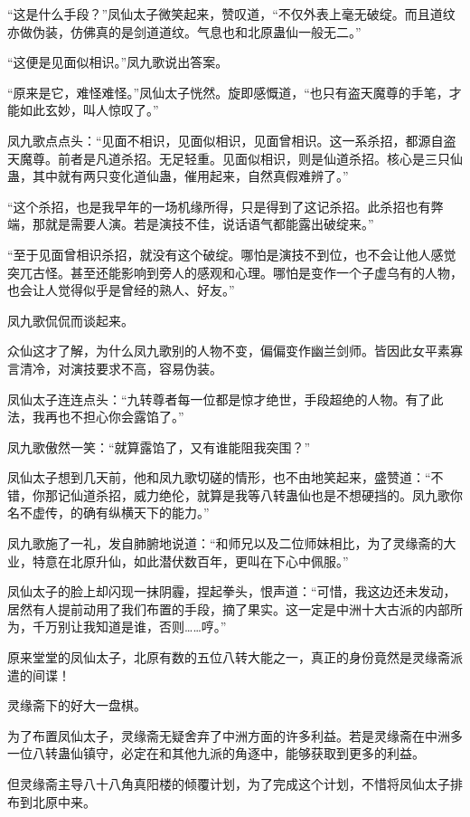 \begin{this_body}
“这是什么手段？”凤仙太子微笑起来，赞叹道，“不仅外表上毫无破绽。而且道纹亦做伪装，仿佛真的是剑道道纹。气息也和北原蛊仙一般无二。”

“这便是见面似相识。”凤九歌说出答案。

“原来是它，难怪难怪。”凤仙太子恍然。旋即感慨道，“也只有盗天魔尊的手笔，才能如此玄妙，叫人惊叹了。”

凤九歌点点头：“见面不相识，见面似相识，见面曾相识。这一系杀招，都源自盗天魔尊。前者是凡道杀招。无足轻重。见面似相识，则是仙道杀招。核心是三只仙蛊，其中就有两只变化道仙蛊，催用起来，自然真假难辨了。”

“这个杀招，也是我早年的一场机缘所得，只是得到了这记杀招。此杀招也有弊端，那就是需要人演。若是演技不佳，说话语气都能露出破绽来。”

“至于见面曾相识杀招，就没有这个破绽。哪怕是演技不到位，也不会让他人感觉突兀古怪。甚至还能影响到旁人的感观和心理。哪怕是变作一个子虚乌有的人物，也会让人觉得似乎是曾经的熟人、好友。”

凤九歌侃侃而谈起来。

众仙这才了解，为什么凤九歌别的人物不变，偏偏变作幽兰剑师。皆因此女平素寡言清冷，对演技要求不高，容易伪装。

凤仙太子连连点头：“九转尊者每一位都是惊才绝世，手段超绝的人物。有了此法，我再也不担心你会露馅了。”

凤九歌傲然一笑：“就算露馅了，又有谁能阻我突围？”

凤仙太子想到几天前，他和凤九歌切磋的情形，也不由地笑起来，盛赞道：“不错，你那记仙道杀招，威力绝伦，就算是我等八转蛊仙也是不想硬挡的。凤九歌你名不虚传，的确有纵横天下的能力。”

凤九歌施了一礼，发自肺腑地说道：“和师兄以及二位师妹相比，为了灵缘斋的大业，特意在北原升仙，如此潜伏数百年，更叫在下心中佩服。”

凤仙太子的脸上却闪现一抹阴霾，捏起拳头，恨声道：“可惜，我这边还未发动，居然有人提前动用了我们布置的手段，摘了果实。这一定是中洲十大古派的内部所为，千万别让我知道是谁，否则……哼。”

原来堂堂的凤仙太子，北原有数的五位八转大能之一，真正的身份竟然是灵缘斋派遣的间谍！

灵缘斋下的好大一盘棋。

为了布置凤仙太子，灵缘斋无疑舍弃了中洲方面的许多利益。若是灵缘斋在中洲多一位八转蛊仙镇守，必定在和其他九派的角逐中，能够获取到更多的利益。

但灵缘斋主导八十八角真阳楼的倾覆计划，为了完成这个计划，不惜将凤仙太子排布到北原中来。


\end{this_body}
